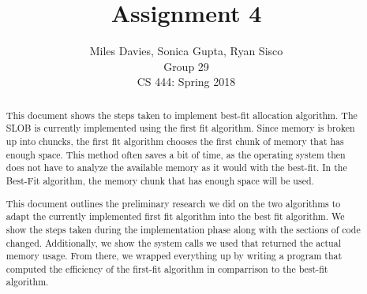 \documentclass[10pt, onecolumn, letterpaper, draftclsnofoot]{IEEEtran}
\title{Assignment 4}
\author{Miles Davies, Sonica Gupta, Ryan Sisco \\ Group 29 \\ CS 444: Spring 2018}
\begin{document}
\maketitle
\begin{abstract}
\noindent This document shows the steps taken to implement best-fit allocation algorithm. The SLOB is currently implemented using the first fit algorithm. Since memory is broken up into chuncks, the first fit algorithm chooses the first chunk of memory that has enough space. This method often saves a bit of time, as the operating system then does not have to analyze the available memory as it would with the best-fit. In the Best-Fit algorithm, the memory chunk that has enough space will be used. 

\noindent This document outlines the preliminary research we did on the two algorithms to adapt the currently implemented first fit algorithm into the best fit algorithm. We show the steps taken during the implementation phase along with the sections of code changed. Additionally, we show the system calls we used that returned the actual memory usage. From there, we wrapped everything up by writing a program that computed the efficiency of the first-fit algorithm in comparrison to the best-fit algorithm.  

\end{abstract}
\newpage

\tableofcontents
\newpage

\end{document}
